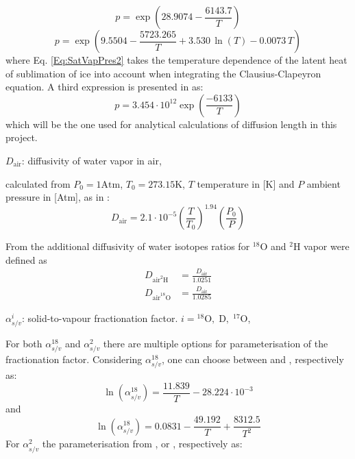 \documentclass[../../CompleteThesis2/Complete_2ndDraft]{subfiles}
\begin{document}
\begin{equation}
	p = \exp\left(28.9074 - \frac{6143.7}{T}\right)
	\label{Eq:SatVapPres1}
\end{equation}
\begin{equation}
	p = \exp\left(9.5504 - \frac{5723.265}{T} + 3.530\, \ln(T) - 0.0073 \, T\right)
	\label{Eq:SatVapPres2}
\end{equation}
where Eq. \ref{Eq:SatVapPres2} takes the temperature dependence of the latent heat of sublimation of ice into account when integrating the Clausius-Clapeyron equation.
A third expression is presented in \cite[Johnsen et al., 2000]{Johnsen2000a} as:
\begin{equation}
	p = 3.454 \cdot 10^{12} \exp\left(\frac{-6133}{T}\right)
	\label{Eq:SatVapPres3}
\end{equation}
which will be the one used for analytical calculations of diffusion length in this project.


$D_{\text{air}}$: diffusivity of water vapor in air,

calculated from $P_0 = 1 \text{Atm}$, $T_0 = 273.15 \text{K}$, $T$ temperature in [K] and $P$ ambient pressure in [Atm], as in \cite[Hall and Prupacher, 1976]{HallPrupacher1976}:
\begin{equation}
	D_{\text{air}} = 2.1 \cdot 10^{-5} \left(\frac{T}{T_0}\right)^{1.94}\left(\frac{P_0}{P}\right)
	\label{Eq:DiffusivAir}
\end{equation}

From \cite[Merlivat, 1978]{Merlivat1978} the additional diffusivity of water isotopes ratios for $^{18}$O and $^2$H vapor were defined as 
\begin{align}
	D_{\text{air}^2\text{H}} &= \frac{D_{\text{air}}}{1.0251} \\
	D_{\text{air}^{18}\text{O}} &= \frac{D_{\text{air}}}{1.0285} 	
\end{align}

$\alpha_{s/v}^i$: solid-to-vapour fractionation factor. $i = {^{18}\text{O},\; \text{D}},\; ^{17}\text{O}$,

For both $\alpha_{s/v}^{18}$ and $\alpha_{s/v}^{2}$ there are multiple options for parameterisation of the fractionation factor. Considering $\alpha_{s/v}^{18}$, one can choose between \cite[Majoube 1971]{Majoube1970} and \cite[Elleh\o j et al., 2013]{Ellehoj2013}, respectively as:
\begin{equation}
	\ln(\alpha_{s/v}^{18}) = \frac{11.839}{T} - 28.224\cdot 10^{-3}
	\label{Eq:FractFact18_Majoube}
\end{equation}
and
\begin{equation}
	\ln(\alpha_{s/v}^{18}) = 0.0831 - \frac{49.192}{T} + \frac{8312.5}{T^2}
	\label{Eq:FractFact18_Ellehoj}
\end{equation}
For $\alpha_{s/v}^{2}$ the parameterisation from \cite[Merlivat and Nief, 1967]{MerlivatNief1967}, \cite[Elleh\o j et al., 2013]{Ellehoj2013} or \cite[Lamb et al., 2017]{Lamb2017}, respectively as:
\end{document}
